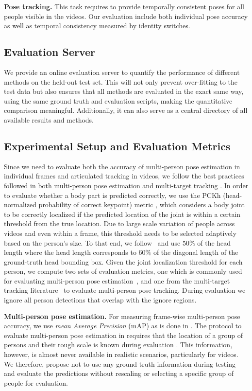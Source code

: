 \documentclass[10pt,twocolumn,letterpaper]{article}
\newcommand{\myparagraph}[1]{\vspace{0.1em}\noindent\textbf{#1}}
\begin{document}
\myparagraph{Pose tracking.} This task requires to provide temporally consistent poses for all people visible in the videos. Our evaluation include both individual pose accuracy as well as temporal consistency measured by identity switches.


\subsection{Evaluation Server} We provide an online evaluation server to quantify the performance of different methods on the held-out test set. This will not only prevent over-fitting to the test data but also ensures that all methods are evaluated in the exact same way, using the same ground truth and evaluation scripts, making the quantitative comparison meaningful. Additionally, it can also serve as a central directory of all available results and methods.


\subsection{Experimental Setup and Evaluation Metrics}
\label{sec:metrics}
Since we need to evaluate both the accuracy of multi-person pose
estimation in individual frames and articulated tracking in videos, we
follow the best practices followed in both multi-person pose
estimation \cite{pishchulin16cvpr} and multi-target tracking
\cite{Milan:2016:MOT16}. In order to evaluate whether a body part is
predicted correctly, we use the PCKh (head-normalized probability of
correct keypoint) metric \cite{andriluka14cvpr}, which considers a
body joint to be correctly localized if the predicted location of the
joint is within a certain threshold from the true location. Due to 
large scale variation of people across videos and even within a frame,
this threshold needs to be selected adaptively based on the person's
size. To that end, we follow~\cite{andriluka14cvpr} and use $50\%$ of
the head length where the head length corresponds to $60\%$ of the
diagonal length of the ground-truth head bounding box. Given the joint
localization threshold for each person, we compute two sets of
evaluation metrics, one which is commonly used for evaluating
multi-person pose estimation~\cite{pishchulin16cvpr}, and one from the
multi-target tracking literature~\cite{Yang:2012:CVPR, Choi:2015:ICCV,
  Milan:2016:MOT16} to evaluate multi-person pose tracking. During evaluation we 
ignore all person detections that overlap with the ignore regions. 

\myparagraph{Multi-person pose estimation.}  For measuring frame-wise
multi-person pose accuracy, we use \emph{mean Average Precision} (mAP)
as is done in \cite{pishchulin16cvpr}.
The protocol to evaluate multi-person pose estimation in
\cite{pishchulin16cvpr} requires that the location of a group of
persons and their rough scale is known during evaluation
\cite{pishchulin16cvpr}. This information, however, is almost never
available in realistic scenarios, particularly for videos. We
therefore, propose not to use any ground-truth information during
testing and evaluate the predictions without rescaling or selecting a
specific group of people for evaluation.
\end{document}
